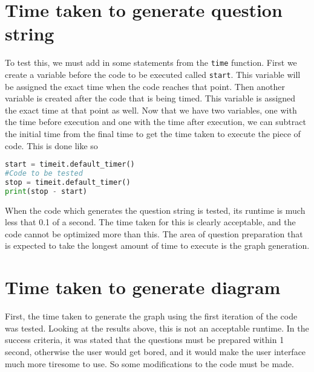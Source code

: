 \section{Time taken to generate question string}
To test this, we must add in some statements from the \texttt{time} function. First we create a variable before the code to be executed called \texttt{start}. This variable will be assigned the exact time when the code reaches that point. Then another variable is created after the code that is being timed. This variable is assigned the exact time at that point as well. Now that we have two variables, one with the time before execution and one with the time after execution, we can subtract the initial time from the final time to get the time taken to execute the piece of code. This is done like so
\begin{lstlisting}[language=Python, caption=Timing code runtime]
start = timeit.default_timer()
#Code to be tested
stop = timeit.default_timer()
print(stop - start)
\end{lstlisting}
When the code which generates the question string is tested, its runtime is much less that 0.1 of a second.
The time taken for this is clearly acceptable, and the code cannot be optimized more than this. The area of question preparation that is expected to take the longest amount of time to execute is the graph generation.
\section{Time taken to generate diagram}
First, the time taken to generate the graph using the first iteration of the code was tested. 
Looking at the results above, this is not an acceptable runtime. In the success criteria, it was stated that the questions must be prepared within 1 second, otherwise the user would get bored, and it would make the user interface much more tiresome to use. So some modifications to the code must be made.

